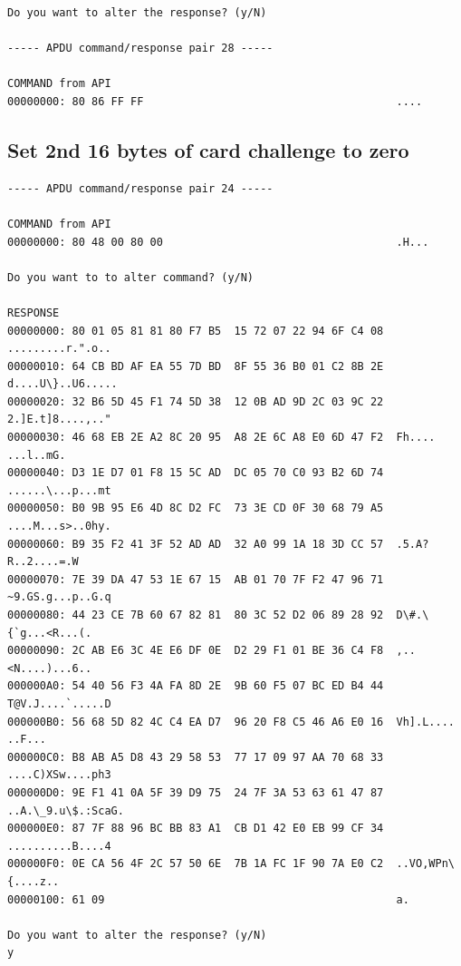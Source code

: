 \documentclass[bsc,frontabs,twoside,singlespacing,parskip,deptreport]{infthesis}     %
\begin{document}
\begin{appendices}
\begin{Verbatim}[commandchars=\\\{\}, fontsize=\small]
Do you want to alter the response? (y/N)

----- APDU command/response pair 28 -----

COMMAND from API
00000000: 80 86 FF FF                                       ....
\end{Verbatim}

\subsection{Set 2nd 16 bytes of card challenge to zero}
\begin{Verbatim}[commandchars=\\\{\}, fontsize=\small]
----- APDU command/response pair 24 -----

COMMAND from API
00000000: 80 48 00 80 00                                    .H...

Do you want to to alter command? (y/N)

RESPONSE
00000000: 80 01 05 81 81 80 F7 B5  15 72 07 22 94 6F C4 08  .........r.".o..
00000010: 64 CB BD AF EA 55 7D BD  8F 55 36 B0 01 C2 8B 2E  d....U\}..U6.....
00000020: 32 B6 5D 45 F1 74 5D 38  12 0B AD 9D 2C 03 9C 22  2.]E.t]8....,.."
00000030: 46 68 EB 2E A2 8C 20 95  A8 2E 6C A8 E0 6D 47 F2  Fh.... ...l..mG.
00000040: D3 1E D7 01 F8 15 5C AD  DC 05 70 C0 93 B2 6D 74  ......\...p...mt
00000050: B0 9B 95 E6 4D 8C D2 FC  73 3E CD 0F 30 68 79 A5  ....M...s>..0hy.
00000060: B9 35 F2 41 3F 52 AD AD  32 A0 99 1A 18 3D CC 57  .5.A?R..2....=.W
00000070: 7E 39 DA 47 53 1E 67 15  AB 01 70 7F F2 47 96 71  ~9.GS.g...p..G.q
00000080: 44 23 CE 7B 60 67 82 81  80 3C 52 D2 06 89 28 92  D\#.\{`g...<R...(.
00000090: 2C AB E6 3C 4E E6 DF 0E  D2 29 F1 01 BE 36 C4 F8  ,..<N....)...6..
000000A0: 54 40 56 F3 4A FA 8D 2E  9B 60 F5 07 BC ED B4 44  T@V.J....`.....D
000000B0: 56 68 5D 82 4C C4 EA D7  96 20 F8 C5 46 A6 E0 16  Vh].L.... ..F...
000000C0: B8 AB A5 D8 43 29 58 53  77 17 09 97 AA 70 68 33  ....C)XSw....ph3
000000D0: 9E F1 41 0A 5F 39 D9 75  24 7F 3A 53 63 61 47 87  ..A.\_9.u\$.:ScaG.
000000E0: 87 7F 88 96 BC BB 83 A1  CB D1 42 E0 EB 99 CF 34  ..........B....4
000000F0: 0E CA 56 4F 2C 57 50 6E  7B 1A FC 1F 90 7A E0 C2  ..VO,WPn\{....z..
00000100: 61 09                                             a.

Do you want to alter the response? (y/N)
y


\end{Verbatim}
\end{appendices}
\end{document}
